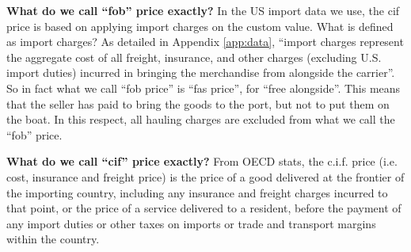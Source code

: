 \documentclass[a4paper,11pt]{article}
\begin{document}
\textbf{What do we call ``fob'' price exactly?} In the US import data we use, the cif price is based on applying import charges on the custom value. What is defined as import charges? As detailed in Appendix \ref{app:data}, ``import charges represent the aggregate cost of all freight, insurance, and other charges (excluding U.S. import duties) incurred in bringing the merchandise from alongside the carrier''. So in fact what we call ``fob price'' is ``fas price'', for ``free alongside''. This means that the seller has paid to bring the goods to the port, but not to put them on the boat. In this respect, all hauling charges are excluded from what we call the ``fob'' price. \bigskip


\textbf{What do we call ``cif'' price exactly?} From OECD stats, the c.i.f. price (i.e. cost, insurance and freight price) is the price of a good delivered at the frontier of the importing country, including any insurance and freight charges incurred to that point, or the price of a service delivered to a resident, before the payment of any import duties or other taxes on imports or trade and transport margins within the country.
\end{document}
